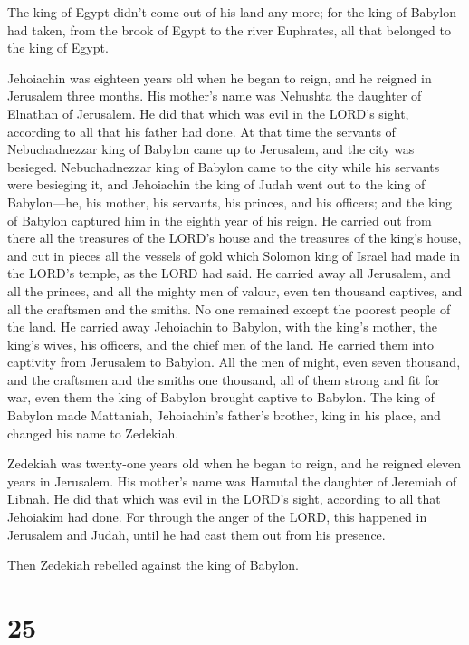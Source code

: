  The king of Egypt didn't come out of his land any more;
for the king of Babylon had taken, from the brook of Egypt to the river
Euphrates, all that belonged to the king of Egypt.

 Jehoiachin was eighteen years old when he began to reign,
and he reigned in Jerusalem three months. His mother's name was Nehushta
the daughter of Elnathan of Jerusalem.  He did that which
was evil in the LORD's sight, according to all that his father had done.
 At that time the servants of Nebuchadnezzar king of
Babylon came up to Jerusalem, and the city was besieged. 
Nebuchadnezzar king of Babylon came to the city while his servants were
besieging it,  and Jehoiachin the king of Judah went out
to the king of Babylon---he, his mother, his servants, his princes, and
his officers; and the king of Babylon captured him in the eighth year of
his reign.  He carried out from there all the treasures
of the LORD's house and the treasures of the king's house, and cut in
pieces all the vessels of gold which Solomon king of Israel had made in
the LORD's temple, as the LORD had said.  He carried away
all Jerusalem, and all the princes, and all the mighty men of valour,
even ten thousand captives, and all the craftsmen and the smiths. No one
remained except the poorest people of the land.  He
carried away Jehoiachin to Babylon, with the king's mother, the king's
wives, his officers, and the chief men of the land. He carried them into
captivity from Jerusalem to Babylon.  All the men of
might, even seven thousand, and the craftsmen and the smiths one
thousand, all of them strong and fit for war, even them the king of
Babylon brought captive to Babylon.  The king of Babylon
made Mattaniah, Jehoiachin's father's brother, king in his place, and
changed his name to Zedekiah.

 Zedekiah was twenty-one years old when he began to
reign, and he reigned eleven years in Jerusalem. His mother's name was
Hamutal the daughter of Jeremiah of Libnah.  He did that
which was evil in the LORD's sight, according to all that Jehoiakim had
done.  For through the anger of the LORD, this happened
in Jerusalem and Judah, until he had cast them out from his presence.

Then Zedekiah rebelled against the king of Babylon.

\hypertarget{section-24}{%
\section{25}\label{section-24}}

